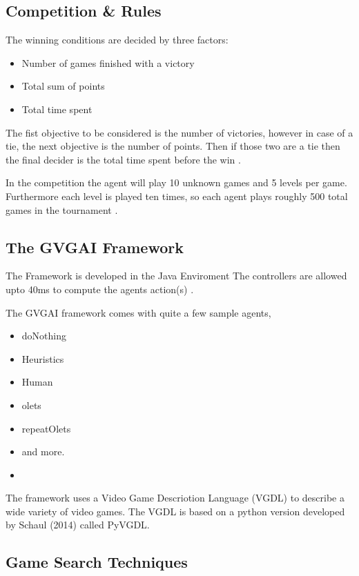 \documentclass[journal]{IEEEtran}
\begin{document}
\subsection{Competition \& Rules}

The winning conditions are decided by three factors:
\begin{itemize}
    \item Number of games finished with a victory
    \item Total sum of points
    \item Total time spent
\end{itemize}
The fist objective to be considered is the number of victories, however in case of a tie, the next objective is the number of points. Then if those two are a tie then the final decider is the total time spent before the win \cite{perez20162014}.

In the competition the agent will play 10 unknown games and 5 levels per game. Furthermore each level is played ten times, so each agent plays roughly 500 total games in the tournament \cite{schuster2015mcts}.



\subsection{The GVGAI Framework}
The Framework is developed in the Java Enviroment
The controllers are allowed upto 40ms to compute the agents action(s) \cite{perez2016GVGAICompetition, GVGAI}.

The GVGAI framework comes with quite a few sample agents, 

\begin{itemize}
    \item doNothing
    \item Heuristics
    \item Human
    \item olets
    \item repeatOlets
    \item and more.
    \item
\end{itemize}


The framework uses a Video Game Descriotion Language (VGDL) to describe a wide variety of video games. The VGDL is based on a python version developed by Schaul (2014) called PyVGDL. 



\subsection{Game Search Techniques}
\end{document}
